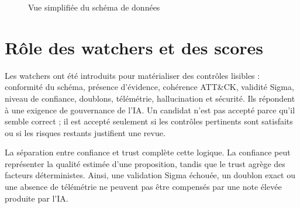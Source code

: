 \begin{figure}[H]
\centering
{}
\caption{Vue simplifiée du schéma de données}
\label{fig:database-schema}
\end{figure}

\section{Rôle des watchers et des scores}

Les watchers ont été introduits pour matérialiser des contrôles lisibles : conformité du schéma, présence d'évidence, cohérence ATT\&CK, validité Sigma, niveau de confiance, doublons, télémétrie, hallucination et sécurité. Ils répondent à une exigence de gouvernance de l'IA. Un candidat n'est pas accepté parce qu'il semble correct ; il est accepté seulement si les contrôles pertinents sont satisfaits ou si les risques restants justifient une revue.

La séparation entre confiance et trust complète cette logique. La confiance peut représenter la qualité estimée d'une proposition, tandis que le trust agrège des facteurs déterministes. Ainsi, une validation Sigma échouée, un doublon exact ou une absence de télémétrie ne peuvent pas être compensés par une note élevée produite par l'IA.
